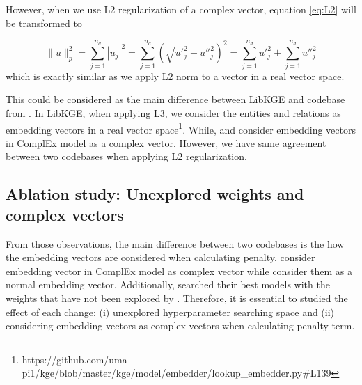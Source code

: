 However, when we use L2 regularization of a complex vector, equation \ref{eq:L2} will be transformed to  

\begin{equation}
    \label{eq:final L2}
    \|u \|^2_p = \sum_{j=1}^{n_d}|u_j|^2 = \sum_{j=1}^{n_d}\left(\sqrt{{u'}_j^2 + {u''}_j^2}\right)^2 = \sum_{j=1}^{n_d}{u'}_j^2 + \sum_{j=1}^{n_d}{u''}_j^2
\end{equation} which is exactly similar as we apply L2 norm to a vector in a real vector space. 


This could be considered as the main difference between LibKGE and codebase from \citet{chen2021relation}. In LibKGE, when applying L3, we consider the entities and relations as embedding vectors in a real vector space\footnote{https://github.com/uma-pi1/kge/blob/master/kge/model/embedder/lookup\_embedder.py\#L139}. While, \citet{chen2021relation} and \citet{lacroix2018canonical} consider embedding vectors in ComplEx model as a complex vector. However, we have same agreement between two codebases when applying L2 regularization. 
\newline

\subsection[Ablation study]{Ablation study: Unexplored weights and complex vectors}

From those observations, the main difference between two codebases is the how the embedding vectors are considered when calculating penalty. \citet{chen2021relation} consider embedding vector in ComplEx model as complex vector while \citet{libkge} consider them as a normal embedding vector. Additionally, \citet{chen2021relation} searched their best models with the weights that have not been explored by \citet{Ruffinelli2020You}. Therefore, it is essential to studied the effect of each change: (i) unexplored hyperparameter searching space and (ii) considering embedding vectors as complex vectors when calculating penalty term. 

